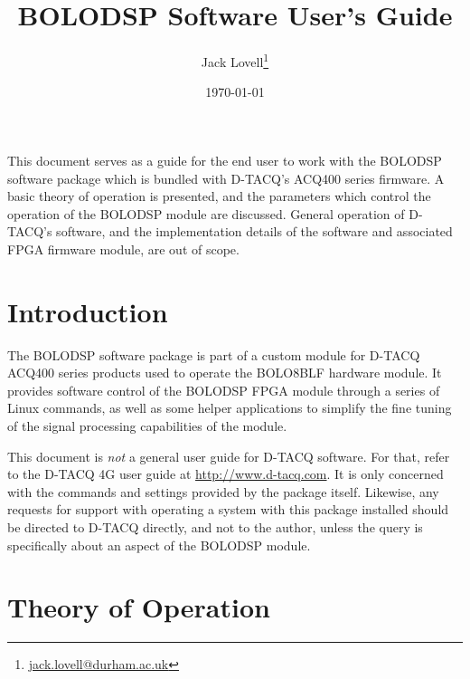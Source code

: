 \documentclass[12pt,a4paper]{article}
\begin{document}
\title{BOLODSP Software User's Guide}

\author{Jack Lovell\thanks{\url{jack.lovell@durham.ac.uk}}}

\date{\today}

\maketitle

\abstract
This document serves as a guide for the end user to work with the BOLODSP software package which is bundled with D-TACQ's ACQ400 series firmware. A basic theory of operation is presented, and the parameters which control the operation of the BOLODSP module are discussed. General operation of D-TACQ's software, and the implementation details of the software and associated FPGA firmware module, are out of scope.

\tableofcontents

\section{Introduction}
The BOLODSP software package is part of a custom module for D-TACQ ACQ400 series products used to operate the BOLO8BLF hardware module. It provides software control of the BOLODSP FPGA module through a series of Linux commands, as well as some helper applications to simplify the fine tuning of the signal processing capabilities of the module.

This document is \textit{not} a general user guide for D-TACQ software. For that, refer to the D-TACQ 4G user guide at \url{http://www.d-tacq.com}. It is only concerned with the commands and settings provided by the package itself. Likewise, any requests for support with operating a system with this package installed should be directed to D-TACQ directly, and not to the author, unless the query is specifically about an aspect of the BOLODSP module.

\section{Theory of Operation}
\end{document}
